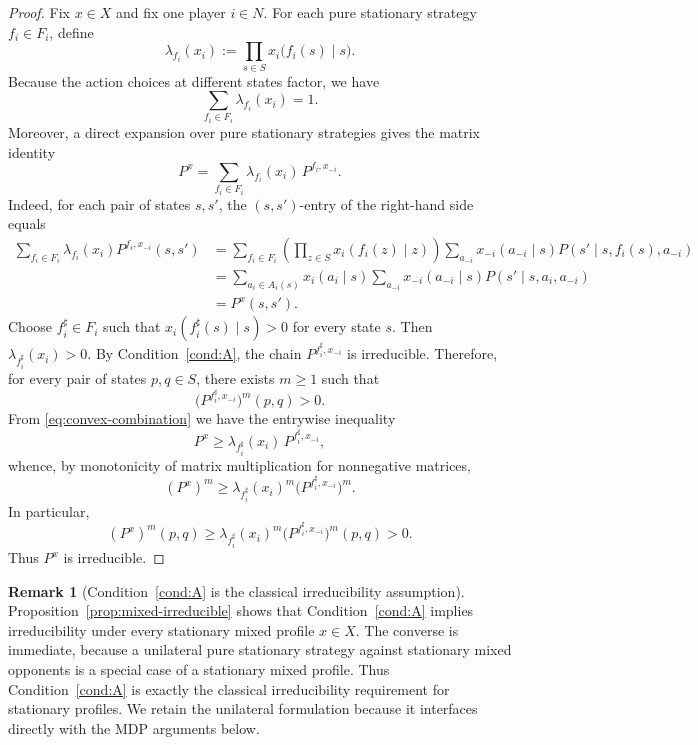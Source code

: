 \documentclass[11pt]{article}
\theoremstyle{definition}
\newtheorem{remark}[theorem]{Remark}
\newcommand{\1}{\mathbf{1}}
\begin{document}
\begin{proof}
Fix $x\in X$ and fix one player $i\in N$. For each pure stationary strategy $f_i\in F_i$, define
\[
\lambda_{f_i}(x_i):=\prod_{s\in S}x_i\bigl(f_i(s)\mid s\bigr).
\]
Because the action choices at different states factor, we have
\[
\sum_{f_i\in F_i}\lambda_{f_i}(x_i)=1.
\]
Moreover, a direct expansion over pure stationary strategies gives the matrix identity
\begin{equation}\label{eq:convex-combination}
P^x=\sum_{f_i\in F_i}\lambda_{f_i}(x_i)\,P^{f_i,x_{-i}}.
\end{equation}
Indeed, for each pair of states $s,s'$, the $(s,s')$-entry of the right-hand side equals
\begin{align*}
\sum_{f_i\in F_i}\lambda_{f_i}(x_i)P^{f_i,x_{-i}}(s,s')
&=\sum_{f_i\in F_i}\left(\prod_{z\in S}x_i(f_i(z)\mid z)\right)
\sum_{a_{-i}}x_{-i}(a_{-i}\mid s)P(s'\mid s,f_i(s),a_{-i})\\
&=\sum_{a_i\in A_i(s)}x_i(a_i\mid s)\sum_{a_{-i}}x_{-i}(a_{-i}\mid s)P(s'\mid s,a_i,a_{-i})\\
&=P^x(s,s').
\end{align*}
Choose $f_i^\sharp\in F_i$ such that $x_i(f_i^\sharp(s)\mid s)>0$ for every state $s$. Then $\lambda_{f_i^\sharp}(x_i)>0$. By Condition~\ref{cond:A}, the chain $P^{f_i^\sharp,x_{-i}}$ is irreducible. Therefore, for every pair of states $p,q\in S$, there exists $m\ge1$ such that
\[
\bigl(P^{f_i^\sharp,x_{-i}}\bigr)^m(p,q)>0.
\]
From \eqref{eq:convex-combination} we have the entrywise inequality
\[
P^x\ge \lambda_{f_i^\sharp}(x_i)\,P^{f_i^\sharp,x_{-i}},
\]
whence, by monotonicity of matrix multiplication for nonnegative matrices,
\[
(P^x)^m\ge \lambda_{f_i^\sharp}(x_i)^m\bigl(P^{f_i^\sharp,x_{-i}}\bigr)^m.
\]
In particular,
\[
(P^x)^m(p,q)\ge \lambda_{f_i^\sharp}(x_i)^m\bigl(P^{f_i^\sharp,x_{-i}}\bigr)^m(p,q)>0.
\]
Thus $P^x$ is irreducible.
\end{proof}

\begin{remark}[Condition~\ref{cond:A} is the classical irreducibility assumption]\label{rem:classical-irreducibility}
Proposition~\ref{prop:mixed-irreducible} shows that Condition~\ref{cond:A} implies irreducibility under every stationary mixed profile $x\in X$. The converse is immediate, because a unilateral pure stationary strategy against stationary mixed opponents is a special case of a stationary mixed profile. Thus Condition~\ref{cond:A} is exactly the classical irreducibility requirement for stationary profiles. We retain the unilateral formulation because it interfaces directly with the MDP arguments below.
\end{remark}
\end{document}
